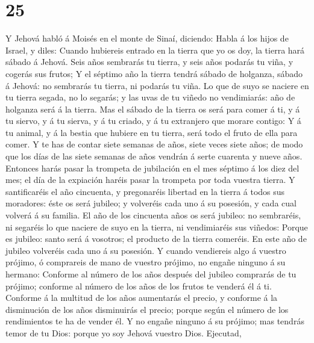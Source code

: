 \hypertarget{section-24}{%
\section{25}\label{section-24}}

 Y Jehová habló á Moisés en el monte de Sinaí, diciendo:
 Habla á los hijos de Israel, y diles: Cuando hubiereis
entrado en la tierra que yo os doy, la tierra hará sábado á Jehová.
 Seis años sembrarás tu tierra, y seis años podarás tu
viña, y cogerás sus frutos;  Y el séptimo año la tierra
tendrá sábado de holganza, sábado á Jehová: no sembrarás tu tierra, ni
podarás tu viña.  Lo que de suyo se naciere en tu tierra
segada, no lo segarás; y las uvas de tu viñedo no vendimiarás: año de
holganza será á la tierra.  Mas el sábado de la tierra os
será para comer á ti, y á tu siervo, y á tu sierva, y á tu criado, y á
tu extranjero que morare contigo:  Y á tu animal, y á la
bestia que hubiere en tu tierra, será todo el fruto de ella para comer.
 Y te has de contar siete semanas de años, siete veces
siete años; de modo que los días de las siete semanas de años vendrán á
serte cuarenta y nueve años.  Entonces harás pasar la
trompeta de jubilación en el mes séptimo á los diez del mes; el día de
la expiación haréis pasar la trompeta por toda vuestra tierra.
 Y santificaréis el año cincuenta, y pregonaréis libertad
en la tierra á todos sus moradores: éste os será jubileo; y volveréis
cada uno á su posesión, y cada cual volverá á su familia.
 El año de los cincuenta años os será jubileo: no
sembraréis, ni segaréis lo que naciere de suyo en la tierra, ni
vendimiaréis sus viñedos:  Porque es jubileo: santo será
á vosotros; el producto de la tierra comeréis.  En este
año de jubileo volveréis cada uno á su posesión.  Y
cuando vendiereis algo á vuestro prójimo, ó comprareis de mano de
vuestro prójimo, no engañe ninguno á su hermano: 
Conforme al número de los años después del jubileo comprarás de tu
prójimo; conforme al número de los años de los frutos te venderá él á
ti.  Conforme á la multitud de los años aumentarás el
precio, y conforme á la disminución de los años disminuirás el precio;
porque según el número de los rendimientos te ha de vender él.
 Y no engañe ninguno á su prójimo; mas tendrás temor de
tu Dios: porque yo soy Jehová vuestro Dios.  Ejecutad,
